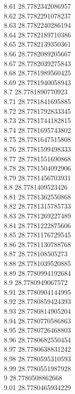 {8.61	28.7782342086957\\
8.62	28.7782291078237\\
8.63	28.7782240286194\\
8.64	28.7782189710386\\
8.65	28.7782139350361\\
8.66	28.7782089205667\\
8.67	28.7782039275843\\
8.68	28.7781989560425\\
8.69	28.7781940058943\\
8.7	28.7781890770923\\
8.71	28.7781841695885\\
8.72	28.7781792833345\\
8.73	28.7781744182815\\
8.74	28.7781695743802\\
8.75	28.7781647515808\\
8.76	28.7781599498333\\
8.77	28.7781551690868\\
8.78	28.7781504092906\\
8.79	28.7781456703931\\
8.8	28.7781409523426\\
8.81	28.7781362550868\\
8.82	28.7781315785733\\
8.83	28.7781269227489\\
8.84	28.7781222875606\\
8.85	28.7781176729545\\
8.86	28.7781130788768\\
8.87	28.778108505273\\
8.88	28.7781039520885\\
8.89	28.7780994192684\\
8.9	28.7780949067572\\
8.91	28.7780904144995\\
8.92	28.7780859424393\\
8.93	28.7780814905204\\
8.94	28.7780770586863\\
8.95	28.7780726468803\\
8.96	28.7780682550454\\
8.97	28.7780638831242\\
8.98	28.7780595310593\\
8.99	28.7780551987928\\
9	28.7780508862668\\
9.01	28.7780465934229\\
}
